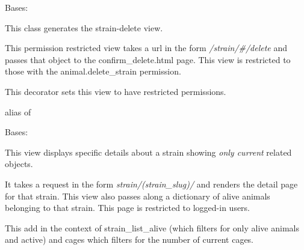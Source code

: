 \documentclass[letterpaper,10pt,english]{sphinxmanual}
\begin{document}
\begin{fulllineitems}
\label{api:mousedb.animal.views.StrainDelete}
Bases: 

This class generates the strain-delete view.

This permission restricted view takes a url in the form \emph{/strain/\#/delete} and passes that object to the confirm\_delete.html page.
This view is restricted to those with the animal.delete\_strain permission.


\begin{fulllineitems}
\label{api:mousedb.animal.views.StrainDelete.dispatch}
This decorator sets this view to have restricted permissions.

\end{fulllineitems}



\begin{fulllineitems}
\label{api:mousedb.animal.views.StrainDelete.model}
alias of 

\end{fulllineitems}


\end{fulllineitems}



\begin{fulllineitems}
\label{api:mousedb.animal.views.StrainDetail}
Bases: {\hyperref[api:mousedb.views.ProtectedDetailView]{}}

This view displays specific details about a strain showing \emph{only current} related objects.

It takes a request in the form \emph{strain/(strain\_slug)/} and renders the detail page for that strain.
This view also passes along a dictionary of alive animals belonging to that strain.
This page is restricted to logged-in users.


\begin{fulllineitems}
\label{api:mousedb.animal.views.StrainDetail.get_context_data}
This add in the context of strain\_list\_alive (which filters for only alive animals and active) and cages which filters for the number of current cages.

\end{fulllineitems}


\end{fulllineitems}
\end{document}
